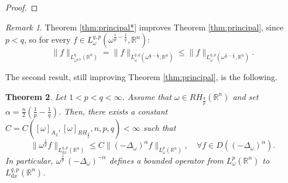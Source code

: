 \documentclass[12pt, letterpaper]{amsart}
\newtheorem{thm}{Theorem}[section]
\theoremstyle{definition}
\theoremstyle{remark}
\newtheorem{rem}[thm]{Remark}
\numberwithin{equation}{section}
\begin{document}
{\begin{proof}
\end{proof}
\begin{rem}
    Theorem \ref{thm:principal*} improves Theorem \ref{thm:principal}, since $p<q$, so for every $f \in L^{q,p}_{\omega}(\omega^{\frac{1}{p}-\frac{1}{q}}, \mathbb{R}^n)$:
    \begin{equation*}
        \| f \|_{L^q_{{\omega}^{q/p}}(\mathbb{R}^n)}=\| f \|_{L^{q,q}_{\omega}(\omega^{\frac{1}{p}-\frac{1}{q}}, \mathbb{R}^n)} \le  \| f \|_{L^{q,p}_{\omega}(\omega^{\frac{1}{p}-\frac{1}{q}}, \mathbb{R}^n)}.
    \end{equation*}
\end{rem}

The second result, still improving Theorem \ref{thm:principal},  is the following.     

\begin{thm}
\label{cor:principal**}
   Let $1< p<q<\infty$. Assume that $\omega \in RH_{\frac{q}{p}}(\mathbb{R}^n)$ and set $\alpha=\frac{n}{2}(\frac{1}{p}-\frac{1}{q})$. Then, there exists a constant $C = C([ \omega  ]_{A_2},[ \omega  ]_{RH_{\frac{q}{p}}},n,p,q)<\infty$ such that
    \begin{equation*}
        \| \omega^{\frac{1}{p}}  f \|_{L^{q,p}_{\mathrm{d}x}(\mathbb{R}^n)} \leq C \| (-\Delta_\omega)^\alpha f \|_{L^p_{\omega}(\mathbb{R}^n)}, \quad \forall f \in D((-\Delta_\omega)^\alpha).
    \end{equation*}
    In particular, $\omega^{\frac{1}{p}} \, (-\Delta_\omega)^{-\alpha}$ defines a bounded operator from $L^p_\omega(\mathbb{R}^n)$ to $L^{q,p}_{\mathrm{d}x}(\mathbb{R}^n)$.
\end{thm}

}
\end{document}
